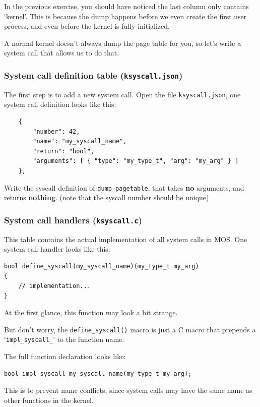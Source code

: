 In the previous exercise, you should have noticed the last column only contains
`kernel'. This is because the dump happens before we even create the first user
process, and even before the kernel is fully initialized.

A normal kernel doesn't always dump the page table for you, so let's write a
system call that allows us to do that.

\subsubsection{System call definition table (\texttt{ksyscall.json})}

The first step is to add a new system call. Open the file \texttt{ksyscall.json},
one system call definition looks like this:

\begin{verbatim}
    {
        "number": 42,
        "name": "my_syscall_name",
        "return": "bool",
        "arguments": [ { "type": "my_type_t", "arg": "my_arg" } ]
    },
\end{verbatim}

\begin{exercise}
    \item Write the syscall definition of \texttt{dump\_pagetable}, that takes
    \textbf{no} arguments, and returns \textbf{nothing}. (note that the syscall
    number should be unique)
\end{exercise}

\subsubsection{System call handlers (\texttt{ksyscall.c})}

This table contains the actual implementation of all system calls in MOS. One
system call handler looks like this:

\begin{verbatim}
bool define_syscall(my_syscall_name)(my_type_t my_arg)
{
    // implementation...
}
\end{verbatim}

\begin{note}
    \item At the first glance, this function may look a bit strange.

    \item But don't worry, the \texttt{define\_syscall()} macro is just a
    C macro that prepends a `\texttt{impl\_syscall\_}' to the function name.

    The full function declaration looks like:

    \begin{verbatim}
bool impl_syscall_my_syscall_name(my_type_t my_arg);
    \end{verbatim}

    \item This is to prevent name conflicts, since system calls may have the same
    name as other functions in the kernel.
\end{note}

